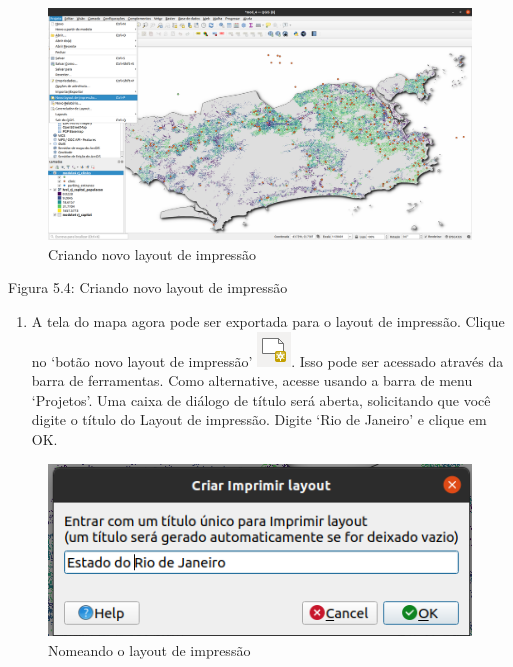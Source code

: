 \documentclass[
]{krantz}
\providecommand{\tightlist}{%
  \setlength{\itemsep}{0pt}\setlength{\parskip}{0pt}}
\begin{document}
\begin{figure}
\centering
\includegraphics{media/modulo5/new-print-layout.png}
\caption{Criando novo layout de impressão}
\end{figure}

Figura 5.4: Criando novo layout de impressão

\begin{enumerate}
\def\labelenumi{\arabic{enumi}.}
\setcounter{enumi}{1}
\tightlist
\item
  A tela do mapa agora pode ser exportada para o layout de impressão. Clique no `botão novo layout de impressão' \includegraphics{media/modulo5/newprint_composer.png}. Isso pode ser acessado através da barra de ferramentas. Como alternative, acesse usando a barra de menu `Projetos'. Uma caixa de diálogo de título será aberta, solicitando que você digite o título do Layout de impressão. Digite `Rio de Janeiro' e clique em OK.
\end{enumerate}

\begin{figure}
\centering
\includegraphics{media/modulo5/new-print-layout-name.png}
\caption{Nomeando o layout de impressão}
\end{figure}
\end{document}
